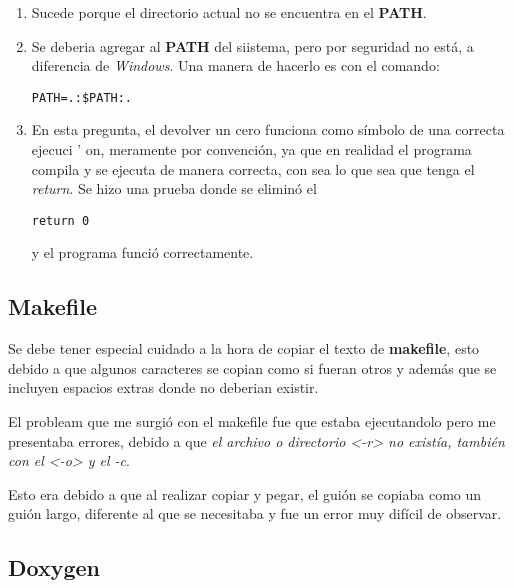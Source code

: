 \documentclass{article}
\begin{document}
\begin{enumerate}
\item Sucede porque el directorio actual no se encuentra en el \textbf{PATH}.
\item Se deberia agregar al \textbf{PATH} del siistema, pero por seguridad no est\' a, a diferencia de \textit{Windows}. Una manera de hacerlo es con el comando: 
\begin{verbatim}
PATH=.:$PATH:.
\end{verbatim}
\item En esta pregunta, el devolver un cero funciona como s\' imbolo de una correcta ejecuci
' on, meramente por convenci\' on, ya que en realidad el programa compila y se ejecuta de manera correcta, con sea lo que sea que tenga el \textit{return}. Se hizo una prueba donde se elimin\' o el \begin{verbatim}
return 0
\end{verbatim}
y el programa funci\' o correctamente.
\end{enumerate}

\subsection*{Makefile}

Se debe tener especial cuidado a la hora de copiar el texto de \textbf{makefile}, esto debido a que algunos caracteres se copian como si fueran otros y adem\' as que se incluyen espacios extras donde no deberian existir.

\bigskip

El probleam que me surgi\' o con el makefile fue que estaba ejecutandolo pero me presentaba errores, debido a que \textit{ el archivo o directorio <-r> no exist\' ia, tambi\' en con el <-o> y el -c}.

Esto era debido a que al realizar copiar y pegar, el gui\' on se copiaba como un gui\' on largo, diferente al que se necesitaba y fue un error muy dif\' icil de observar.


\subsection*{Doxygen}
\end{document}
